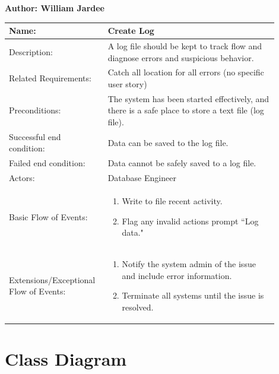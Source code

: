 \documentclass[11pt]{article}
\begin{document}
\begin{table}[!ht]
\begin{center}
\textbf{Author: William Jardee}
\vspace*{1em}

\begin{tabular}{p{0.30\linewidth}p{0.60\linewidth}}
	Name: & Create Log\\\hline
	Description: & A log file should be kept to track flow and diagnose errors and suspicious behavior.\\\hline
	Related Requirements:& Catch all location for all errors (no specific user story)\\\hline
	Preconditions:& The system has been started effectively, and there is a safe place to store a text file (log file).\\\hline
	Successful end condition:& Data can be saved to the log file.\\\hline
	Failed end condition:& Data cannot be safely saved to a log file.\\\hline
	Actors:& Database Engineer \\\hline
	Basic Flow of Events: & 
	\begin{enumerate}
	\item Write to file recent activity.
	\item Flag any invalid actions prompt ``Log data."
	\end{enumerate}\\\hline
	Extensions/Exceptional Flow of Events: & 
	\begin{enumerate}
	\item Notify the system admin of the issue and include error information.
	\item Terminate all systems until the issue is resolved.
	\end{enumerate}
\end{tabular}
\label{des:create_log}
\end{center}
\end{table}

\clearpage



\section*{Class Diagram}
\end{document}
